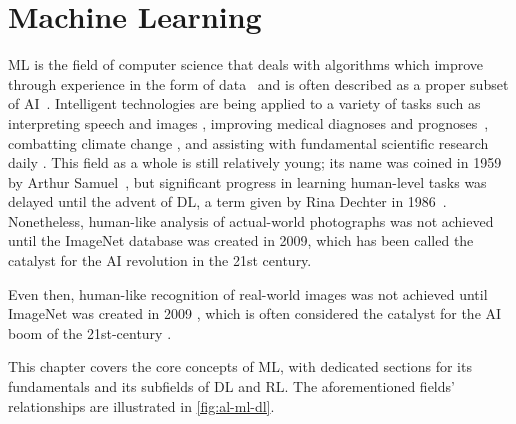 \chapter{Machine Learning\label{chap:machine_learning}}


\Gls{ML} is the field of computer science that deals with algorithms which improve through experience in the form of data~\cite{Mitchell97} and is often described as a proper subset of AI~\cite{Goodfellow-et-al-2016}. Intelligent technologies are being applied to a variety of tasks such as interpreting speech and images \cite{Farabet2013,Girshick2013,Chen2014,He2014,Shelhamer2014,Girshick2015,Ren2015,Redmon2015}, improving medical diagnoses and prognoses~\cite{Kourou2015, Abbasi2019, Singh2019, Rajkomar2019, May2021}, combatting climate change \cite{Rolnick2023}, and assisting with fundamental scientific research daily \cite{Libbrecht2015}. This field as a whole is still relatively young; its name was coined in 1959 by Arthur Samuel~\cite{5392560}, but significant progress in learning human-level tasks was delayed until the advent of \gls{DL}, a term given by Rina Dechter in 1986~\cite{Rina1986}. Nonetheless, human-like analysis of actual-world photographs was not achieved until the ImageNet database was created in 2009, which has been called the catalyst for the \gls{AI} revolution in the 21st century.



Even then, human-like recognition of real-world images was not achieved until ImageNet was created in 2009 \cite{5206848}, which is often considered the catalyst for the AI boom of the 21st-century \cite{hardy_2016}.


This chapter covers the core concepts of \gls{ML}, with dedicated sections for
its fundamentals and its subfields of \gls{DL} and \gls{RL}. The aforementioned fields' relationships are illustrated in \autoref{fig:al-ml-dl}.

